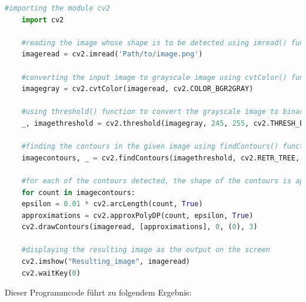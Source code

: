 \begin{lstlisting}[language=Python,caption=ApproxPolyDP Beispiel,label=maai:approxpolydp:code]
    #importing the module cv2
    import cv2

    #reading the image whose shape is to be detected using imread() function
    imageread = cv2.imread('Path/to/image.png')

    #converting the input image to grayscale image using cvtColor() function
    imagegray = cv2.cvtColor(imageread, cv2.COLOR_BGR2GRAY)

    #using threshold() function to convert the grayscale image to binary image
    _, imagethreshold = cv2.threshold(imagegray, 245, 255, cv2.THRESH_BINARY_INV)

    #finding the contours in the given image using findContours() function
    imagecontours, _ = cv2.findContours(imagethreshold, cv2.RETR_TREE, cv2.CHAIN_APPROX_SIMPLE)

    #for each of the contours detected, the shape of the contours is approximated using approxPolyDP() function and the contours are drawn in the image using drawContours() function
    for count in imagecontours:
    epsilon = 0.01 * cv2.arcLength(count, True)
    approximations = cv2.approxPolyDP(count, epsilon, True)
    cv2.drawContours(imageread, [approximations], 0, (0), 3)
    
    #displaying the resulting image as the output on the screen
    cv2.imshow("Resulting_image", imageread)
    cv2.waitKey(0)
\end{lstlisting}

Dieser Programmcode führt zu folgendem Ergebnis:


